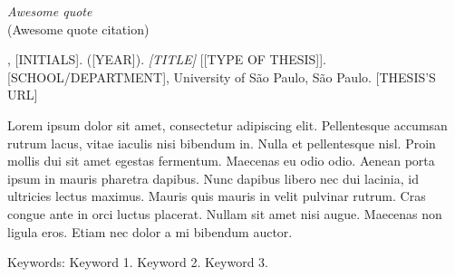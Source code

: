 \documentclass[
  12pt,
  a4paper,
  oneside]{tesesusp}
\begin{document}

\begin{epigrafe}
  \vspace*{\fill}
	\begin{flushright}
	  \textit{Awesome quote} \\
		(Awesome quote citation)
	\end{flushright}
\end{epigrafe}


\setlength{\absparsep}{18pt}
\begin{resumo}

\begin{flushleft}
[SURNAME], [INITIALS]. ([YEAR]). \textit{[TITLE]} [[TYPE OF THESIS]]. [SCHOOL/DEPARTMENT], University of São Paulo, São Paulo. [THESIS'S URL]
\end{flushleft}

Lorem ipsum dolor sit amet, consectetur adipiscing elit. Pellentesque accumsan rutrum lacus, vitae iaculis nisi bibendum in. Nulla et pellentesque nisl. Proin mollis dui sit amet egestas fermentum. Maecenas eu odio odio. Aenean porta ipsum in mauris pharetra dapibus. Nunc dapibus libero nec dui lacinia, id ultricies lectus maximus. Mauris quis mauris in velit pulvinar rutrum. Cras congue ante in orci luctus placerat. Nullam sit amet nisi augue. Maecenas non ligula eros. Etiam nec dolor a mi bibendum auctor.

Keywords: Keyword 1. Keyword 2. Keyword 3.
\end{resumo}

\end{document}
